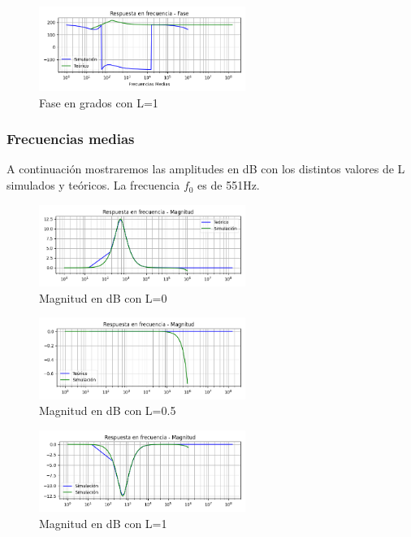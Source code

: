 \begin{figure}[H]
	\centering
	\includegraphics[width=0.6\textwidth]{../Ejercicio4-EcualizadorDeFase/Informe/lowFrecL100Fase.png} 
	\caption{Fase en grados con L=1}
	\label{lowFaseL10}
\end{figure}


\subsubsection{Frecuencias medias}
A continuación mostraremos las amplitudes en dB con los distintos valores de L simulados y teóricos. La frecuencia $f_0$ es de 551Hz.


\begin{figure}[H]
	\centering
	\includegraphics[width=0.6\textwidth]{../Ejercicio4-EcualizadorDeFase/Informe/medFrecL000Mag.png} 
	\caption{Magnitud en dB con L=0}
	\label{medMagL00}
\end{figure}
	
\begin{figure}[H]
	\centering
	\includegraphics[width=0.6\textwidth]{../Ejercicio4-EcualizadorDeFase/Informe/medFrecL050Mag.png} 
	\caption{Magnitud en dB con L=0.5}
	\label{medMagL05}
\end{figure}

\begin{figure}[H]
	\centering
	\includegraphics[width=0.6\textwidth]{../Ejercicio4-EcualizadorDeFase/Informe/medFrecL100Mag.png} 
	\caption{Magnitud en dB con L=1}
	\label{medMagL10}
\end{figure}


